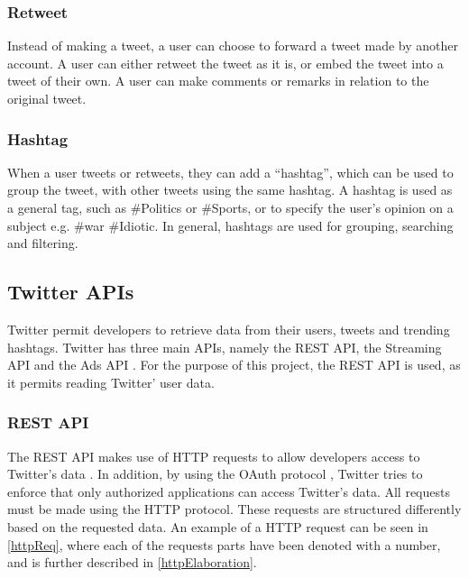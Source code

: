 \subsubsection{Retweet}
Instead of making a tweet, a user can choose to forward a tweet made by another
account. A user can either retweet the tweet as it is, or embed the tweet into a
tweet of their own. A user can make comments or remarks in relation to the
original tweet.

\subsubsection{Hashtag}
When a user tweets or retweets, they can add a ``hashtag'', which can be used to
group the tweet, with other tweets using the same hashtag. A hashtag is used as
a general tag, such as \#Politics or \#Sports, or to specify the user's
opinion on a subject e.g. \#war \#Idiotic. In general, hashtags are used for
grouping, searching and filtering.

\subsection{Twitter \acp{API}}
Twitter permit developers to retrieve data from their users, tweets and
trending hashtags. Twitter has three main \acp{API}, namely the \ac{REST} \ac{API}, the Streaming
\ac{API} and the Ads \ac{API} \citep{TwitterDevDocs}. For the purpose of this
project, the \ac{REST} \ac{API} is used, as it permits reading Twitter' user
data.

\subsubsection{REST API}
The \ac{REST} \ac{API} makes use of \ac{HTTP} requests to allow developers
access to Twitter's data \citep{TwitterREST}. In addition, by using the OAuth protocol
\citep{TwitterOAuth}, Twitter tries to enforce that only authorized applications
can access Twitter's data. All requests must be made using the
\ac{HTTP} protocol. These requests are structured differently based on the
requested data. An example of a \ac{HTTP} request can be seen in
\autoref{httpReq}, where each of the requests parts have been denoted with a
number, and is further described in \autoref{httpElaboration}.


